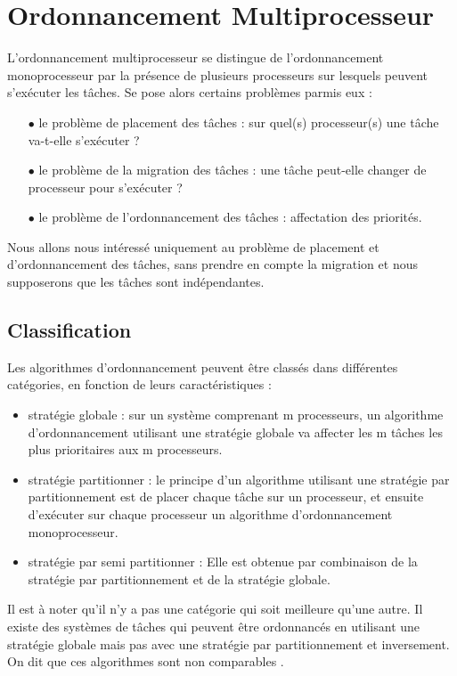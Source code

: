 \section{Ordonnancement Multiprocesseur}
L'ordonnancement multiprocesseur se distingue de l'ordonnancement
monoprocesseur par la présence de plusieurs processeurs sur lesquels
peuvent s'exécuter les tâches. Se pose alors certains problèmes parmis
eux :
\begin{itemize}
\item[$\bullet$] le problème de placement des tâches : sur quel(s) processeur(s) une tâche va-t-elle s'exécuter ?
\item[$\bullet$] le problème de la migration des tâches : une tâche peut-elle changer de processeur pour s'exécuter ?
\item[$\bullet$] le problème de l'ordonnancement des tâches : affectation des priorités.
\end{itemize}

Nous allons nous intéressé uniquement au problème de placement et
d'ordonnancement des tâches, sans prendre en compte la migration et
nous supposerons que les tâches sont indépendantes.

\subsection{Classification}
 Les algorithmes d'ordonnancement peuvent être classés
dans différentes catégories, en fonction de leurs caractéristiques :
\begin{itemize}
\item  stratégie globale : sur un système comprenant m
  processeurs, un algorithme d'ordonnancement utilisant une stratégie
  globale va affecter les m tâches les plus prioritaires aux m
  processeurs.
\item  stratégie partitionner : le principe d'un algorithme
  utilisant une stratégie par partitionnement est de placer chaque
  tâche sur un processeur, et ensuite d'exécuter sur chaque processeur
  un algorithme d'ordonnancement monoprocesseur.
\item stratégie par semi partitionner : Elle est obtenue
  par combinaison de la stratégie par partitionnement et de la
  stratégie globale.
\end{itemize}
Il est à noter qu'il n'y a pas une catégorie qui soit
meilleure qu'une autre. Il existe des systèmes de tâches qui peuvent
être ordonnancés en utilisant une stratégie globale mais pas avec une
stratégie par partitionnement et inversement. On dit que ces
algorithmes sont non comparables \cite{LW82}.

